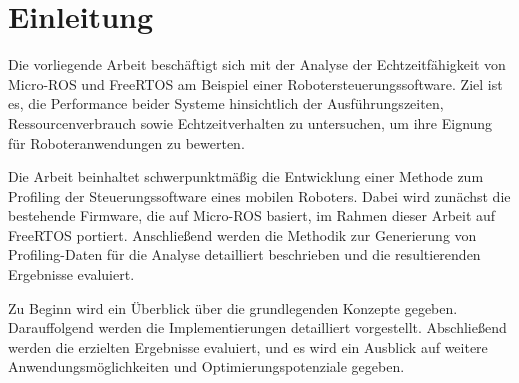 \section*{Einleitung}

Die vorliegende Arbeit beschäftigt sich mit der Analyse der Echtzeitfähigkeit
von Micro-ROS und FreeRTOS am Beispiel einer Robotersteuerungssoftware. Ziel ist
es, die Performance beider Systeme hinsichtlich der Ausführungszeiten,
Ressourcenverbrauch sowie Echtzeitverhalten zu untersuchen, um ihre Eignung für
Roboteranwendungen zu bewerten.

Die Arbeit beinhaltet schwerpunktmäßig die Entwicklung einer Methode zum
Profiling der Steuerungssoftware eines mobilen Roboters. Dabei wird zunächst die
bestehende Firmware, die auf Micro-ROS basiert, im Rahmen dieser Arbeit auf
FreeRTOS portiert. Anschließend werden die Methodik zur Generierung von
Profiling-Daten für die Analyse detailliert beschrieben und die resultierenden
Ergebnisse evaluiert.

Zu Beginn wird ein Überblick über die grundlegenden Konzepte gegeben.
Darauffolgend werden die Implementierungen detailliert vorgestellt. Abschließend
werden die erzielten Ergebnisse evaluiert, und es wird ein Ausblick auf weitere
Anwendungsmöglichkeiten und Optimierungspotenziale gegeben.
